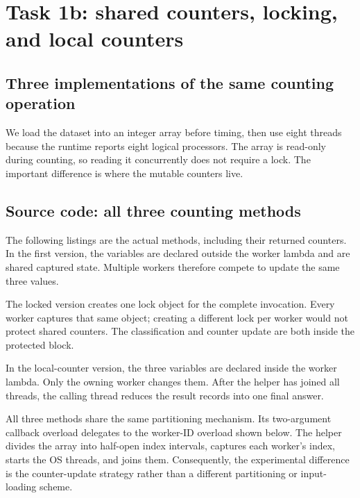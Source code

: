 \chapter{Task 1b: shared counters, locking, and local counters}
\section{Three implementations of the same counting operation}
We load the dataset into an integer array before timing, then use eight threads because the runtime reports eight logical processors. The array is read-only during counting, so reading it concurrently does not require a lock. The important difference is where the mutable counters live.

\section{Source code: all three counting methods}
The following listings are the actual methods, including their returned counters. In the first version, the variables are declared outside the worker lambda and are shared captured state. Multiple workers therefore compete to update the same three values.


The locked version creates one lock object for the complete invocation. Every worker captures that same object; creating a different lock per worker would not protect shared counters. The classification and counter update are both inside the protected block.


In the local-counter version, the three variables are declared inside the worker lambda. Only the owning worker changes them. After the helper has joined all threads, the calling thread reduces the result records into one final answer.


All three methods share the same partitioning mechanism. Its two-argument callback overload delegates to the worker-ID overload shown below. The helper divides the array into half-open index intervals, captures each worker's index, starts the OS threads, and joins them. Consequently, the experimental difference is the counter-update strategy rather than a different partitioning or input-loading scheme.

